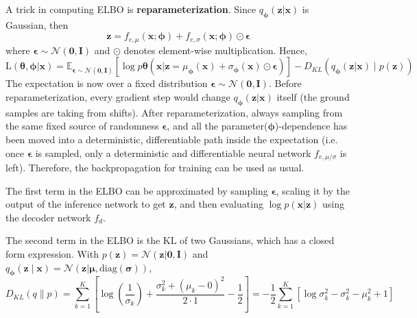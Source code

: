 \documentclass[11pt]{article}
\begin{document}
A trick in computing ELBO is \textbf{reparameterization}. Since $q_{\boldsymbol{\phi}}(\boldsymbol{z}|\boldsymbol{x})$ is Gaussian, then 
\[
\boldsymbol{z} = f_{e,\mu}(\boldsymbol{x}; \boldsymbol{\phi}) + f_{e,\sigma}(\boldsymbol{x}; \boldsymbol{\phi}) \odot \boldsymbol{\epsilon}
\]
where $\boldsymbol{\epsilon} \sim \mathcal{N}(\boldsymbol{0}, \boldsymbol{I})$ and $\odot$ denotes element-wise multiplication. Hence,
\[
\text{L}(\boldsymbol{\theta}, \boldsymbol{\phi} | \boldsymbol{x}) = \mathbb{E}_{\boldsymbol{\epsilon} \sim \mathcal{N}(\boldsymbol{0}, \mathbf{I})} \left[ \log p{\boldsymbol{\theta}}(\boldsymbol{x} | \boldsymbol{z} = \mu_{\boldsymbol{\phi}}(\boldsymbol{x}) + \sigma_{\boldsymbol{\phi}}(\boldsymbol{x}) \odot \boldsymbol{\epsilon}) \right] - D_{KL} \left( q_{\boldsymbol{\phi}}(\boldsymbol{z}|\boldsymbol{x}) \mid p(\boldsymbol{z}) \right)
\]
The expectation is now over a fixed distribution $\boldsymbol{\epsilon} \sim \mathcal{N}(\boldsymbol{0}, \boldsymbol{I})$. Before reparameterization, every gradient step would change $q_{\boldsymbol{\phi}}(\boldsymbol{z}|\boldsymbol{x})$ itself (the ground samples are taking from shifts). After reparameterization, always sampling from the same fixed source of randomness $\boldsymbol{\epsilon}$, and all the parameter($\boldsymbol{\phi}$)-dependence has been moved into a deterministic, differentiable path inside the expectation (i.e. once $\boldsymbol{\epsilon}$ is sampled, only a deterministic and differentiable neural network $f_{e, \mu / \sigma}$ is left). Therefore, the backpropagation for training can be used as usual.

The first term in the ELBO can be approximated by sampling $\boldsymbol{\epsilon}$, scaling it by the output of the inference network to get $\boldsymbol{z}$, and then evaluating $\log p(\boldsymbol{x}|\boldsymbol{z})$ using the decoder network $f_d$.

The second term in the ELBO is the KL of two Gaussians, which has a closed form expression. With $p(\boldsymbol{z}) = \mathcal{N}(\boldsymbol{z}|\boldsymbol{0}, \mathbf{I})$ and $q_{\boldsymbol{\phi}}(\boldsymbol{z} \mid \boldsymbol{x}) = \mathcal{N}(\boldsymbol{z}|\boldsymbol{\mu}, \text{diag}(\boldsymbol{\sigma}))$,
\[
D_{KL}\left(q \| p\right) = \sum_{k=1}^{K} \left[ \log\left(\frac{1}{\sigma_k}\right) + \frac{\sigma_k^2 + (\mu_k - 0)^2}{2 \cdot 1} - \frac{1}{2} \right] = -\frac{1}{2} \sum_{k=1}^{K} \left[ \log \sigma_k^2 - \sigma_k^2 - \mu_k^2 + 1 \right]
\]
\end{document}
